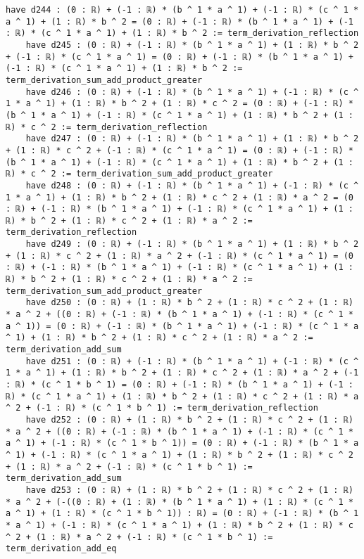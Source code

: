 \documentclass{article}
\begin{document}
\begin{tcolorbox}[colback=white!10, width=\linewidth]
\begin{lstlisting}[language=Lean4]
    have d244 : (0 : ℝ) + (-1 : ℝ) * (b ^ 1 * a ^ 1) + (-1 : ℝ) * (c ^ 1 * a ^ 1) + (1 : ℝ) * b ^ 2 = (0 : ℝ) + (-1 : ℝ) * (b ^ 1 * a ^ 1) + (-1 : ℝ) * (c ^ 1 * a ^ 1) + (1 : ℝ) * b ^ 2 := term_derivation_reflection
    have d245 : (0 : ℝ) + (-1 : ℝ) * (b ^ 1 * a ^ 1) + (1 : ℝ) * b ^ 2 + (-1 : ℝ) * (c ^ 1 * a ^ 1) = (0 : ℝ) + (-1 : ℝ) * (b ^ 1 * a ^ 1) + (-1 : ℝ) * (c ^ 1 * a ^ 1) + (1 : ℝ) * b ^ 2 := term_derivation_sum_add_product_greater
    have d246 : (0 : ℝ) + (-1 : ℝ) * (b ^ 1 * a ^ 1) + (-1 : ℝ) * (c ^ 1 * a ^ 1) + (1 : ℝ) * b ^ 2 + (1 : ℝ) * c ^ 2 = (0 : ℝ) + (-1 : ℝ) * (b ^ 1 * a ^ 1) + (-1 : ℝ) * (c ^ 1 * a ^ 1) + (1 : ℝ) * b ^ 2 + (1 : ℝ) * c ^ 2 := term_derivation_reflection
    have d247 : (0 : ℝ) + (-1 : ℝ) * (b ^ 1 * a ^ 1) + (1 : ℝ) * b ^ 2 + (1 : ℝ) * c ^ 2 + (-1 : ℝ) * (c ^ 1 * a ^ 1) = (0 : ℝ) + (-1 : ℝ) * (b ^ 1 * a ^ 1) + (-1 : ℝ) * (c ^ 1 * a ^ 1) + (1 : ℝ) * b ^ 2 + (1 : ℝ) * c ^ 2 := term_derivation_sum_add_product_greater
    have d248 : (0 : ℝ) + (-1 : ℝ) * (b ^ 1 * a ^ 1) + (-1 : ℝ) * (c ^ 1 * a ^ 1) + (1 : ℝ) * b ^ 2 + (1 : ℝ) * c ^ 2 + (1 : ℝ) * a ^ 2 = (0 : ℝ) + (-1 : ℝ) * (b ^ 1 * a ^ 1) + (-1 : ℝ) * (c ^ 1 * a ^ 1) + (1 : ℝ) * b ^ 2 + (1 : ℝ) * c ^ 2 + (1 : ℝ) * a ^ 2 := term_derivation_reflection
    have d249 : (0 : ℝ) + (-1 : ℝ) * (b ^ 1 * a ^ 1) + (1 : ℝ) * b ^ 2 + (1 : ℝ) * c ^ 2 + (1 : ℝ) * a ^ 2 + (-1 : ℝ) * (c ^ 1 * a ^ 1) = (0 : ℝ) + (-1 : ℝ) * (b ^ 1 * a ^ 1) + (-1 : ℝ) * (c ^ 1 * a ^ 1) + (1 : ℝ) * b ^ 2 + (1 : ℝ) * c ^ 2 + (1 : ℝ) * a ^ 2 := term_derivation_sum_add_product_greater
    have d250 : (0 : ℝ) + (1 : ℝ) * b ^ 2 + (1 : ℝ) * c ^ 2 + (1 : ℝ) * a ^ 2 + ((0 : ℝ) + (-1 : ℝ) * (b ^ 1 * a ^ 1) + (-1 : ℝ) * (c ^ 1 * a ^ 1)) = (0 : ℝ) + (-1 : ℝ) * (b ^ 1 * a ^ 1) + (-1 : ℝ) * (c ^ 1 * a ^ 1) + (1 : ℝ) * b ^ 2 + (1 : ℝ) * c ^ 2 + (1 : ℝ) * a ^ 2 := term_derivation_add_sum
    have d251 : (0 : ℝ) + (-1 : ℝ) * (b ^ 1 * a ^ 1) + (-1 : ℝ) * (c ^ 1 * a ^ 1) + (1 : ℝ) * b ^ 2 + (1 : ℝ) * c ^ 2 + (1 : ℝ) * a ^ 2 + (-1 : ℝ) * (c ^ 1 * b ^ 1) = (0 : ℝ) + (-1 : ℝ) * (b ^ 1 * a ^ 1) + (-1 : ℝ) * (c ^ 1 * a ^ 1) + (1 : ℝ) * b ^ 2 + (1 : ℝ) * c ^ 2 + (1 : ℝ) * a ^ 2 + (-1 : ℝ) * (c ^ 1 * b ^ 1) := term_derivation_reflection
    have d252 : (0 : ℝ) + (1 : ℝ) * b ^ 2 + (1 : ℝ) * c ^ 2 + (1 : ℝ) * a ^ 2 + ((0 : ℝ) + (-1 : ℝ) * (b ^ 1 * a ^ 1) + (-1 : ℝ) * (c ^ 1 * a ^ 1) + (-1 : ℝ) * (c ^ 1 * b ^ 1)) = (0 : ℝ) + (-1 : ℝ) * (b ^ 1 * a ^ 1) + (-1 : ℝ) * (c ^ 1 * a ^ 1) + (1 : ℝ) * b ^ 2 + (1 : ℝ) * c ^ 2 + (1 : ℝ) * a ^ 2 + (-1 : ℝ) * (c ^ 1 * b ^ 1) := term_derivation_add_sum
    have d253 : (0 : ℝ) + (1 : ℝ) * b ^ 2 + (1 : ℝ) * c ^ 2 + (1 : ℝ) * a ^ 2 + (-((0 : ℝ) + (1 : ℝ) * (b ^ 1 * a ^ 1) + (1 : ℝ) * (c ^ 1 * a ^ 1) + (1 : ℝ) * (c ^ 1 * b ^ 1)) : ℝ) = (0 : ℝ) + (-1 : ℝ) * (b ^ 1 * a ^ 1) + (-1 : ℝ) * (c ^ 1 * a ^ 1) + (1 : ℝ) * b ^ 2 + (1 : ℝ) * c ^ 2 + (1 : ℝ) * a ^ 2 + (-1 : ℝ) * (c ^ 1 * b ^ 1) := term_derivation_add_eq

\end{lstlisting}
\end{tcolorbox}
\end{document}
